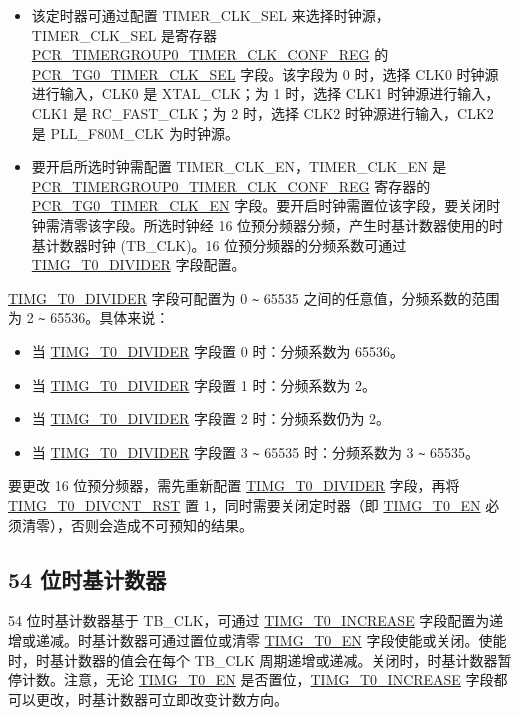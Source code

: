 \documentclass[main\_\_CN.tex]{subfiles}
\begin{document}
\begin{itemize}
\item 该定时器可通过配置 TIMER\_CLK\_SEL 来选择时钟源，TIMER\_CLK\_SEL 是寄存器 \hyperref[regdesc:PCRTIMERGROUP0TIMERCLKCONFREG]{PCR\_TIMERGROUP0\_TIMER\_CLK\_CONF\_REG} 的 \hyperref[fielddesc:PCRTG0TIMERCLKSEL]{PCR\_TG0\_TIMER\_CLK\_SEL} 字段。该字段为 0 时，选择 CLK0 时钟源进行输入，CLK0 是 XTAL\_CLK；为 1 时，选择 CLK1 时钟源进行输入，CLK1 是 RC\_FAST\_CLK；为 2 时，选择 CLK2 时钟源进行输入，CLK2 是 PLL\_F80M\_CLK 为时钟源。
\item 要开启所选时钟需配置 TIMER\_CLK\_EN，TIMER\_CLK\_EN 是 \hyperref[regdesc:PCRTIMERGROUP0TIMERCLKCONFREG]{PCR\_TIMERGROUP0\_TIMER\_CLK\_CONF\_REG} 寄存器的 \hyperref[fielddesc:PCRTG0TIMERCLKEN]{PCR\_TG0\_TIMER\_CLK\_EN} 字段。要开启时钟需置位该字段，要关闭时钟需清零该字段。所选时钟经 16 位预分频器分频，产生时基计数器使用的时基计数器时钟 (TB\_CLK)。16 位预分频器的分频系数可通过 \hyperref[fielddesc:TIMGTXDIVIDER]{TIMG\_T0\_DIVIDER} 字段配置。
\end{itemize}

\hyperref[fielddesc:TIMGTXDIVIDER]{TIMG\_T0\_DIVIDER} 字段可配置为 0 \verb+~+ 65535 之间的任意值，分频系数的范围为 2 \verb+~+ 65536。具体来说：

\begin{itemize}
    \item 当 \hyperref[fielddesc:TIMGTXDIVIDER]{TIMG\_T0\_DIVIDER} 字段置 0 时：分频系数为 65536。
    \item 当 \hyperref[fielddesc:TIMGTXDIVIDER]{TIMG\_T0\_DIVIDER} 字段置 1 时：分频系数为 2。
    \item 当 \hyperref[fielddesc:TIMGTXDIVIDER]{TIMG\_T0\_DIVIDER} 字段置 2 时：分频系数仍为 2。
    \item 当 \hyperref[fielddesc:TIMGTXDIVIDER]{TIMG\_T0\_DIVIDER} 字段置 3 \verb+~+ 65535 时：分频系数为 3 \verb+~+ 65535。
\end{itemize}

要更改 16 位预分频器，需先重新配置 \hyperref[fielddesc:TIMGTXDIVIDER]{TIMG\_T0\_DIVIDER} 字段，再将 \hyperref[fielddesc:TIMGTXDIVCNTRST]{TIMG\_T0\_DIVCNT\_RST} 置 1，同时需要关闭定时器（即 \hyperref[fielddesc:TIMGTXEN]{TIMG\_T0\_EN} 必须清零），否则会造成不可预知的结果。

\subsection{54 位时基计数器}

54 位时基计数器基于 TB\_CLK，可通过 \hyperref[fielddesc:TIMGTXINCREASE]{TIMG\_T0\_INCREASE} 字段配置为递增或递减。时基计数器可通过置位或清零 \hyperref[fielddesc:TIMGTXEN]{TIMG\_T0\_EN} 字段使能或关闭。使能时，时基计数器的值会在每个 TB\_CLK 周期递增或递减。关闭时，时基计数器暂停计数。注意，无论 \hyperref[fielddesc:TIMGTXEN]{TIMG\_T0\_EN} 是否置位，\hyperref[fielddesc:TIMGTXINCREASE]{TIMG\_T0\_INCREASE} 字段都可以更改，时基计数器可立即改变计数方向。
\end{document}
